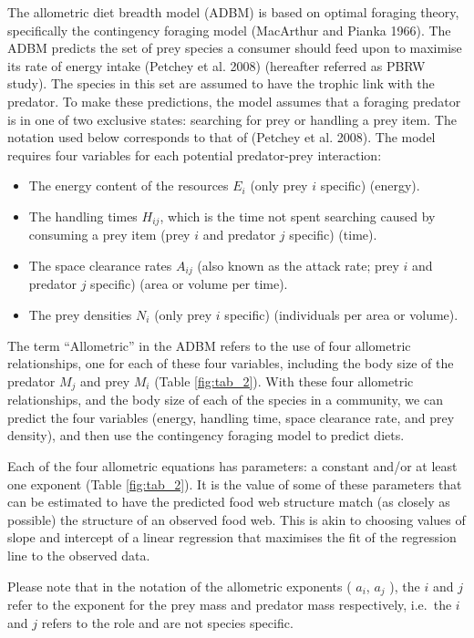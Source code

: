 \documentclass{article}
\begin{document}
The allometric diet breadth model (ADBM) is based on optimal foraging
theory, specifically the contingency foraging model (MacArthur and
Pianka 1966). The ADBM predicts the set of prey species a consumer
should feed upon to maximise its rate of energy intake (Petchey et al.
2008) (hereafter referred as PBRW study). The species in this set are
assumed to have the trophic link with the predator. To make these
predictions, the model assumes that a foraging predator is in one of two
exclusive states: searching for prey or handling a prey item. The
notation used below corresponds to that of (Petchey et al. 2008). The
model requires four variables for each potential predator-prey
interaction:

\begin{itemize}
\tightlist
\item
  The energy content of the resources \(E_i\) (only prey \(i\) specific)
  (energy).
\item
  The handling times \(H_{ij}\), which is the time not spent searching
  caused by consuming a prey item (prey \(i\) and predator \(j\)
  specific) (time).
\item
  The space clearance rates \(A_{ij}\) (also known as the attack rate;
  prey \(i\) and predator \(j\) specific) (area or volume per time).
\item
  The prey densities \(N_i\) (only prey \(i\) specific) (individuals per
  area or volume).
\end{itemize}

The term ``Allometric'' in the ADBM refers to the use of four allometric
relationships, one for each of these four variables, including the body
size of the predator \(M_j\) and prey \(M_i\) (Table \ref{fig:tab_2}).
With these four allometric relationships, and the body size of each of
the species in a community, we can predict the four variables (energy,
handling time, space clearance rate, and prey density), and then use the
contingency foraging model to predict diets.

Each of the four allometric equations has parameters: a constant and/or
at least one exponent (Table \ref{fig:tab_2}). It is the value of some
of these parameters that can be estimated to have the predicted food web
structure match (as closely as possible) the structure of an observed
food web. This is akin to choosing values of slope and intercept of a
linear regression that maximises the fit of the regression line to the
observed data.

Please note that in the notation of the allometric exponents ( \(a_i\),
\(a_j\) ), the \(i\) and \(j\) refer to the exponent for the prey mass
and predator mass respectively, i.e.~the \(i\) and \(j\) refers to the
role and are not species specific.
\end{document}
